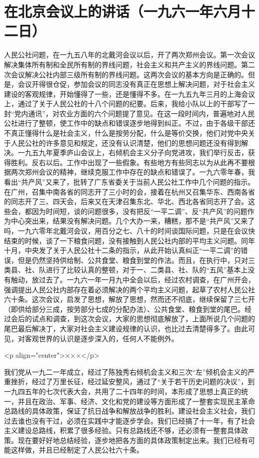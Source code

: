 \section{在北京会议上的讲话（一九六一年六月十二日）}


人民公社问题，在一九五八年的北戴河会议以后，开了两次郑州会议。第一次会议解决集体所有制和全民所有制的界线问题，社会主义和共产主义的界线问题。第二次会议解决公社内部三级所有制的界线问题。这两次会议的基本方向是正确的。但是，会议开得很仓促，参加会议的同志没有真正在思想上解决问题，对于社会主义建设的客观规律，开始懂得了一些，还是懂得不多。在一九五九年三月的上海会议上，通过了关于人民公社的十八个问题的纪要。后来，我给小队以上的干部写了一封“党内通讯”，对农业方面的六个问题提了意见。在这一段时间内，普遍地对人民公社进行了整顿，使工作中的缺点和错误逐步地得到纠正。不过，由于各级干部还不真正懂得什么是社会主义，什么是按劳分配，什么是等价交换，他们对党中央关于人民公社的许多意见和规定，还没有认识清楚，他们的思想问题还没有得到解决。一九五九年夏季庐山会议上，右倾机会主义分子向党进攻，我们举行反击，获得胜利。反右以后。工作中出现了一些假象。有些地方有些同志以为从此再不要根据两次郑州会议的精神，继续克服工作中存在的缺点和错误了。一九六零年春，我看出“共产风”又来了，批转了广东省委关于当前人民公社工作中几个问题的指示。在广州，召集中南各省的同志开了三小时的会，接着在杭州又召集华东、西南各省的同志开了三、四天会，后来又在天津召集东北、华北、西北各省同志开了会。这些会，都因为时间短，谈的问题很多，没有把反“一平二调”、反“共产风”的问题作为中心突出来，结果没有解决问题。几个大办一来，糟糕，那不是“共产风”又来了吗，一九六零年北戴河会议，用百分之七、八十的时间谈国际问题，只是在会议快结束的时候，谈了一下粮食问题，没有接触到人民公社内部的平均主义问题。同年十月，中央发了关于人民公社十二条的指示，从此开始认真纠正“一平二调”的错误，但是仍然坚持供给制、公共食堂、粮食到堂的作法。而且，在执行中，只对三类县、社、队进行了比较认真的整顿，对于一、二类县、社、队的“五风”基本上没有触动，放过去了。一九六一年一月九中全会以后，经过农村调查，在广州开会，强调提出人民公社内部存在着必须解决的两个平均主义问题，起草了农村人民公社六十条。这次会议，启发了思想，解放了思想，然而还不彻底，继续保留了三七开（即供给部分三成，按劳部分七成的分配办法）、公共食堂、粮食到堂的尾巴。经过会后的试点和调查，到这次会议，大家的思想彻底解放了，上面所说几个问题的尾巴最后解决丁，大家对社会主义建设规律的认识，也比过去清楚得多了。由此可见，对客观世界的认识是逐步深入的，任何人不能例外。

<p align="center">×××</p>

我们党从一九二一年成立，经过了陈独秀右倾机会主义和三次“左”倾机会主义的严重挫折，经过了万里长征，经过延安整风，通过了“关于若干历史问题的决议”，到一九四五年的七次代表大会，共用了二十四年的时间，本形成了思想上真正的统一，并且在政治、军事、经济、文化和党的建设等方面形成了一整套实现民主革命总路线的具体政策，保证了抗日战争和解放战争的胜利。建设社会主义社会，我们过去谁也没有干过，必须在实践中才能逐步学会。我们已经搞了十一年，有了社会主义建设总路线，积累了很多经验。只有总路线还不够，还必须有一整套具体政策。现在要好好地总结经验，逐步地把各方面的具体政策制定出来。我们已经有可能这样做，并且已经制定了人民公社六十条。

